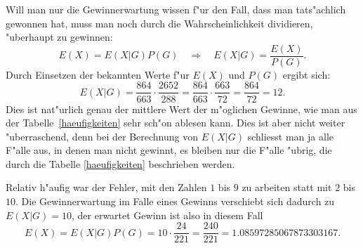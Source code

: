 \begin{loesung}
\begin{teilaufgaben}
Will man nur die Gewinnerwartung wissen f"ur den Fall, dass
man tats"achlich gewonnen hat, muss man noch durch die
Wahrscheinlichkeit dividieren, "uberhaupt zu gewinnen:
\[
E(X)=E(X|G)P(G)\quad\Rightarrow\quad E(X|G)=\frac{E(X)}{P(G)}.
\]
Durch Einsetzen der bekannten Werte f"ur $E(X)$ und $P(G)$
ergibt sich:
\[
E(X|G)
=
\frac{864}{663}\cdot\frac{2652}{288}
=
\frac{864}{663}\cdot\frac{663}{72}
=
\frac{864}{72}=
12.
\]
Dies ist nat"urlich genau der mittlere Wert der m"oglichen
Gewinne, wie man aus der Tabelle~\ref{haeufigkeiten}
sehr sch"on ablesen kann. Dies ist aber nicht weiter
"uberraschend, denn bei der Berechnung von $E(X|G)$
schliesst man ja alle F"alle aus, in denen man nicht
gewinnt, es bleiben nur die F"alle "ubrig, die durch
die Tabelle \ref{haeufigkeiten} beschrieben werden.

Relativ h"aufig war der Fehler, mit den Zahlen $1$ bis $9$
zu arbeiten statt mit $2$ bis $10$. Die Gewinnerwartung
im Falle eines Gewinns verschiebt sich dadurch zu
$E(X|G)=10$, der erwartet Gewinn ist also in diesem Fall
\[
E(X)=E(X|G)P(G)=10\cdot\frac{24}{221}=\frac{240}{221}=
1.08597285067873303167.
\]
\end{teilaufgaben}
\end{loesung}

